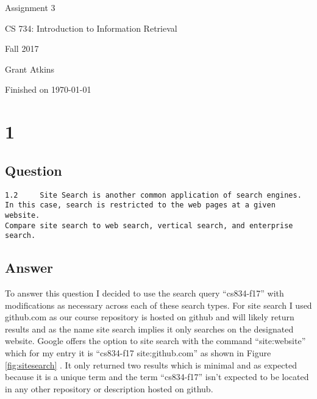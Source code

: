 \documentclass[letterpaper,11pt]{article}
\begin{document}
\begin{titlepage}

\begin{center}

\Huge{Assignment 3}

\Large{CS 734:  Introduction to Information Retrieval}

\Large{Fall 2017}

\Large{Grant Atkins}

\Large Finished on \today

\end{center}

\end{titlepage}

\newpage


\section*{1}

\subsection*{Question}

\begin{verbatim}
1.2 	Site Search is another common application of search engines.
In this case, search is restricted to the web pages at a given website.
Compare site search to web search, vertical search, and enterprise search.
\end{verbatim}

\subsection*{Answer}

To answer this question I decided to use the search query ``cs834-f17'' with modifications as necessary across each of these search types.
For site search I used github.com as our course repository is hosted on github and will likely return results and as the name site search implies it only searches on the designated website.
Google offers the option to site search with the command ``site:website'' which for my entry it is ``cs834-f17 site:github.com''  as shown in Figure \ref{fig:sitesearch} \cite{googlesite}.
It only returned two results which is minimal and as expected because it is a unique term and the term ``cs834-f17'' isn't expected to be located in any other repository or description hosted on github.
\end{document}
